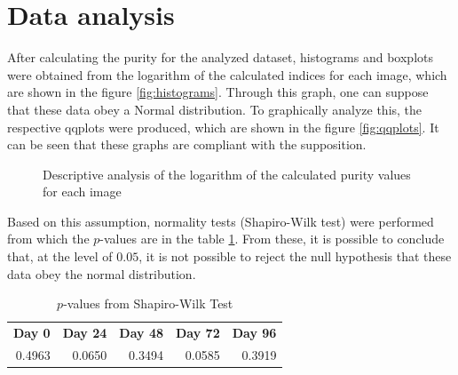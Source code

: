 \documentclass[12pt]{article}
\begin{document}
\section{Data analysis}

After calculating the purity for the analyzed dataset, histograms and boxplots were obtained from the logarithm of the calculated indices for each image, which are shown in the figure \ref{fig:histograms}. Through this graph, one can suppose that these data obey a Normal distribution. To graphically analyze this, the respective qqplots were produced, which are shown in the figure \ref{fig:qqplots}. It can be seen that these graphs are compliant with the supposition.

\begin{figure}[hbt]
  \centering
  \caption{Descriptive analysis of the logarithm of the calculated purity values for each image}
  \label{fig:desc_analysis}
\end{figure}

Based on this assumption, normality tests (Shapiro-Wilk test) were performed from which the $p$-values are in the table \ref{tab:pvalues}. From these, it is possible to conclude that, at the level of $0.05$, it is not possible to reject the null hypothesis that these data obey the normal distribution. 

\begin{table}[hbt]
  \centering
  \caption{$p$-values from Shapiro-Wilk Test}
  \label{tab:pvalues}
  \begin{tabular}{rrrrr}
    \toprule
    \textbf{Day 0} & \textbf{Day 24} & \textbf{Day 48} & \textbf{Day 72} & \textbf{Day 96}\\
    0.4963 & 0.0650 & 0.3494 & 0.0585 & 0.3919\\
    \bottomrule
  \end{tabular}
\end{table}
\end{document}
